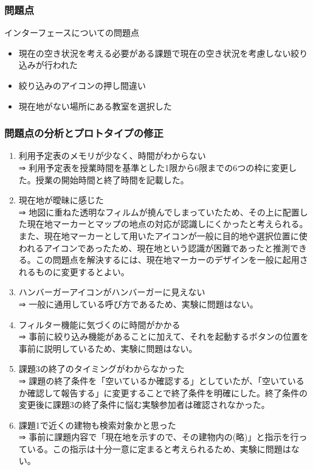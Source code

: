 \documentclass[12pt,a4paper,dvipdf]{jsarticle}
\begin{document}
\subsubsection{問題点}
インターフェースについての問題点
\begin{itemize}
    \item 現在の空き状況を考える必要がある課題で現在の空き状況を考慮しない絞り込みが行われた
    \item 絞り込みのアイコンの押し間違い
    \item 現在地がない場所にある教室を選択した
\end{itemize}
\subsubsection{問題点の分析とプロトタイプの修正}
\begin{enumerate}
    \item 利用予定表のメモリが少なく、時間がわからない\\
          ⇒ 利用予定表を授業時間を基準とした1限から6限までの6つの枠に変更した。授業の開始時間と終了時間を記載した。
    \item 現在地が曖昧に感じた\\
          ⇒ 地図に重ねた透明なフィルムが撓んでしまっていたため、その上に配置した現在地マーカーとマップの地点の対応が認識しにくかったと考えられる。また、現在地マーカーとして用いたアイコンが一般に目的地や選択位置に使われるアイコンであったため、現在地という認識が困難であったと推測できる。この問題点を解決するには、現在地マーカーのデザインを一般に起用されるものに変更するとよい。
    \item ハンバーガーアイコンがハンバーガーに見えない\\
          ⇒ 一般に通用している呼び方であるため、実験に問題はない。
    \item フィルター機能に気づくのに時間がかかる\\
          ⇒ 事前に絞り込み機能があることに加えて、それを起動するボタンの位置を事前に説明しているため、実験に問題はない。
    \item 課題3の終了のタイミングがわからなかった\\
          ⇒ 課題の終了条件を「空いているか確認する」としていたが、「空いているか確認して報告する」に変更することで終了条件を明確にした。終了条件の変更後に課題3の終了条件に悩む実験参加者は確認されなかった。
    \item 課題1で近くの建物も検索対象かと思った\\
          ⇒ 事前に課題内容で「現在地を示すので、その建物内の(略)」と指示を行っている。この指示は十分一意に定まると考えられるため、実験に問題はない。

\end{enumerate}
\end{document}
